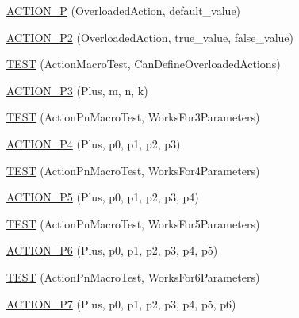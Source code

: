 \begin{DoxyCompactItemize}
\item 
\mbox{\hyperlink{namespacetesting_1_1gmock__generated__actions__test_a1ee92e8b8bd6a5a54f5d2fcdb9f122b8}{A\+C\+T\+I\+O\+N\+\_\+P}} (Overloaded\+Action, default\+\_\+value)
\item 
\mbox{\hyperlink{namespacetesting_1_1gmock__generated__actions__test_a233ee874462c7956e154945975da1127}{A\+C\+T\+I\+O\+N\+\_\+\+P2}} (Overloaded\+Action, true\+\_\+value, false\+\_\+value)
\item 
\mbox{\hyperlink{namespacetesting_1_1gmock__generated__actions__test_a8a3d26365bdae172067fe3a63bd88e85}{T\+E\+ST}} (Action\+Macro\+Test, Can\+Define\+Overloaded\+Actions)
\item 
\mbox{\hyperlink{namespacetesting_1_1gmock__generated__actions__test_a35c62beac532eaff7e54b8ad4a7fe1cf}{A\+C\+T\+I\+O\+N\+\_\+\+P3}} (Plus, m, n, k)
\item 
\mbox{\hyperlink{namespacetesting_1_1gmock__generated__actions__test_a3579cf2428f584d2a837c2c219ec1d5a}{T\+E\+ST}} (Action\+Pn\+Macro\+Test, Works\+For3\+Parameters)
\item 
\mbox{\hyperlink{namespacetesting_1_1gmock__generated__actions__test_ac86e9e1fa5be82823e80247ba093301c}{A\+C\+T\+I\+O\+N\+\_\+\+P4}} (Plus, p0, p1, p2, p3)
\item 
\mbox{\hyperlink{namespacetesting_1_1gmock__generated__actions__test_a6c13e382007960236763d638542bc5fe}{T\+E\+ST}} (Action\+Pn\+Macro\+Test, Works\+For4\+Parameters)
\item 
\mbox{\hyperlink{namespacetesting_1_1gmock__generated__actions__test_a948863fb38d913f02a0c5bde6be0b0a0}{A\+C\+T\+I\+O\+N\+\_\+\+P5}} (Plus, p0, p1, p2, p3, p4)
\item 
\mbox{\hyperlink{namespacetesting_1_1gmock__generated__actions__test_a132cab07373e037a06807a5948b1410b}{T\+E\+ST}} (Action\+Pn\+Macro\+Test, Works\+For5\+Parameters)
\item 
\mbox{\hyperlink{namespacetesting_1_1gmock__generated__actions__test_a97cbcc90a3063a1882886ded61fc8979}{A\+C\+T\+I\+O\+N\+\_\+\+P6}} (Plus, p0, p1, p2, p3, p4, p5)
\item 
\mbox{\hyperlink{namespacetesting_1_1gmock__generated__actions__test_a9031cb5f0e3d9de21ed3ff0a98a311d4}{T\+E\+ST}} (Action\+Pn\+Macro\+Test, Works\+For6\+Parameters)
\item 
\mbox{\hyperlink{namespacetesting_1_1gmock__generated__actions__test_a58bc376a0637fc1e89e6503466d1b9cd}{A\+C\+T\+I\+O\+N\+\_\+\+P7}} (Plus, p0, p1, p2, p3, p4, p5, p6)
\item 

\end{DoxyCompactItemize}
